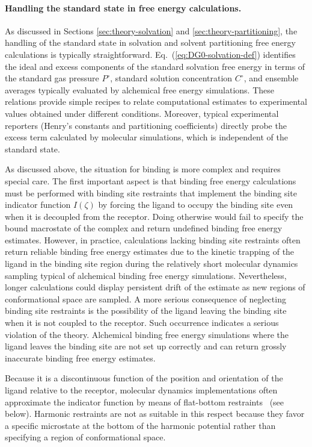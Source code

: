 \documentclass[9pt,bestpractices]{livecoms}
\begin{document}
\paragraph{Handling the standard state in free energy calculations.}
As discussed in Sections \ref{sec:theory-solvation} and \ref{sec:theory-partitioning}, the handling of the standard state in solvation and solvent partitioning free energy calculations is typically straightforward. Eq.~(\ref{eq:DG0-solvation-def}) identifies the ideal and excess components of the standard solvation free energy in terms of the standard gas pressure $P^\circ$, standard solution concentration $C^\circ$, and ensemble averages typically evaluated by alchemical free energy simulations. These relations provide simple recipes to relate computational estimates to experimental values obtained under different conditions. Moreover, typical experimental reporters (Henry's constants and partitioning coefficients) directly probe the excess term calculated by molecular simulations, which is independent of the standard state.

As discussed above, the situation for binding is more complex and requires special care. The first important aspect is that binding free energy calculations must be performed with binding site restraints that implement the binding site indicator function $I(\zeta)$ by forcing the ligand to occupy the binding site even when it is decoupled from the receptor. Doing otherwise would fail to specify the bound macrostate of the complex and return undefined binding free energy estimates. However, in practice, calculations lacking binding site restraints often return reliable binding free energy estimates due to the kinetic trapping of the ligand in the binding site region during the relatively short molecular dynamics sampling typical of alchemical binding free energy simulations. Nevertheless, longer calculations could display persistent drift of the estimate as new regions of conformational space are sampled. A more serious consequence of neglecting binding site restraints is the possibility of the ligand leaving the binding site when it is not coupled to the receptor. Such occurrence indicates a serious violation of the theory. Alchemical binding free energy simulations where the ligand leaves the binding site are not set up correctly and can return grossly inaccurate binding free energy estimates.

Because it is a discontinuous function of the position and orientation of the ligand relative to the receptor, molecular dynamics implementations often approximate the indicator function by means of flat-bottom restraints~\cite{chen2007can, wu2021alchemical} (see below). Harmonic restraints are not as suitable in this respect because they favor a specific microstate at the bottom of the harmonic potential rather than specifying a region of conformational space.
\end{document}
